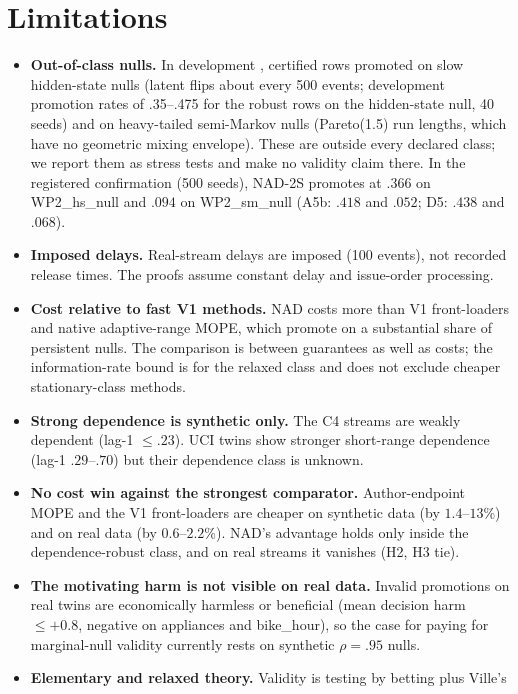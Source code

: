 \section{Limitations}\label{sec:limitations}

\begin{itemize}
  \item \textbf{Out-of-class nulls.} In development \devnote, certified rows promoted on slow
  hidden-state nulls (latent flips about every 500 events; development promotion rates of
  .35--.475 for the robust rows on the hidden-state null, 40 seeds) and on heavy-tailed
  semi-Markov nulls (Pareto(1.5) run lengths, which have no geometric mixing envelope). These are
  outside every declared class; we report them as stress tests and make no validity claim there.
  In the registered confirmation (500 seeds), NAD-2S promotes at $.366$ on WP2\_hs\_null and $.094$ on
  WP2\_sm\_null (A5b: $.418$ and $.052$; D5: $.438$ and $.068$).
  \item \textbf{Imposed delays.} Real-stream delays are imposed (100 events), not recorded release
  times. The proofs assume constant delay and issue-order processing.
  \item \textbf{Cost relative to fast V1 methods.} NAD costs more than V1 front-loaders and native
  adaptive-range MOPE, which promote on a substantial share of persistent nulls. The comparison is
  between guarantees as well as costs; the information-rate bound is for the relaxed class and does
  not exclude cheaper stationary-class methods.
  \item \textbf{Strong dependence is synthetic only.} The C4 streams are weakly dependent (lag-1
  $\le.23$). UCI twins show stronger short-range dependence (lag-1 $.29$--$.70$) but their dependence
  class is unknown.
  \item \textbf{No cost win against the strongest comparator.} Author-endpoint MOPE and the V1
  front-loaders are cheaper on synthetic data (by $1.4$--$13\%$) and on real data (by $0.6$--$2.2\%$).
  NAD's advantage holds only inside the dependence-robust class, and on real streams it vanishes (H2,
  H3 tie).
  \item \textbf{The motivating harm is not visible on real data.} Invalid promotions on real twins
  are economically harmless or beneficial (mean decision harm $\le+0.8$, negative on appliances and
  bike\_hour), so the case for paying for marginal-null validity currently rests on synthetic
  $\rho=.95$ nulls.
  \item \textbf{Elementary and relaxed theory.} Validity is testing by betting plus Ville's

\end{itemize}
